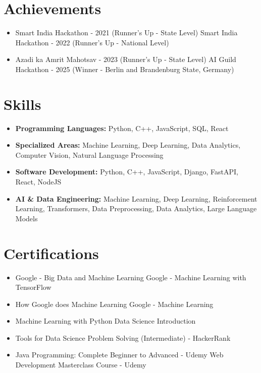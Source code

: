 \documentclass[a4paper,10pt]{article}
\begin{document}
\section*{Achievements}
\begin{itemize}
\item Smart India Hackathon - 2021 (Runner's Up - State Level) \hfill Smart India Hackathon - 2022 (Runner's Up - National Level)
\item Azadi ka Amrit Mahotsav - 2023 (Runner's Up - State Level) \hfill AI Guild Hackathon - 2025 (Winner - Berlin and Brandenburg State, Germany)
\end{itemize}

\section*{Skills}
\begin{itemize}
  \item \textbf{Programming Languages:} Python, C++, JavaScript, SQL, React
  \item \textbf{Specialized Areas:} Machine Learning, Deep Learning, Data Analytics, Computer Vision, Natural Language Processing
  \item \textbf{Software Development:} Python, C++, JavaScript, Django, FastAPI, React, NodeJS
  \item \textbf{AI \& Data Engineering:} Machine Learning, Deep Learning, Reinforcement Learning, Transformers, Data Preprocessing, Data Analytics, Large Language Models
\end{itemize}

\section*{Certifications}
\begin{itemize}
\item Google - Big Data and Machine Learning \hfill Google - Machine Learning with TensorFlow
\item How Google does Machine Learning \hfill Google - Machine Learning
\item Machine Learning with Python \hfill Data Science Introduction
\item Tools for Data Science \hfill Problem Solving (Intermediate) - HackerRank
\item Java Programming: Complete Beginner to Advanced - Udemy \hfill Web Development Masterclass Course - Udemy
\end{itemize}
\end{document}
